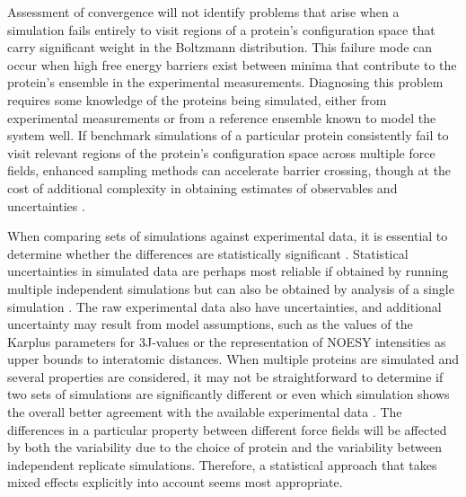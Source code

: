 \documentclass[9pt,review]{livecoms}
\begin{document}
Assessment of convergence will not identify problems that arise when a simulation fails entirely to visit regions of a protein's configuration space that carry significant weight in the Boltzmann distribution.
This failure mode can occur when high free energy barriers exist between minima that contribute to the protein's ensemble in the experimental measurements.
Diagnosing this problem requires some knowledge of the proteins being simulated, either from experimental measurements or from a reference ensemble known to model the system well.
If benchmark simulations of a particular protein consistently fail to visit relevant regions of the protein's configuration space across multiple force fields, enhanced sampling methods \cite{henin_enhanced_2022} can accelerate barrier crossing, though at the cost of additional complexity in obtaining estimates of observables and uncertainties \cite{grossfield_best_2019}.

When comparing sets of simulations against experimental data, it is essential to determine whether the differences are statistically significant \cite{van_gunsteren_validation_2018}.
Statistical uncertainties in simulated data are perhaps most reliable if obtained by running multiple independent simulations but can also be obtained by analysis of a single simulation \cite{grossfield_best_2019}.
The raw experimental data also have uncertainties, and additional uncertainty may result from model assumptions, such as the values of the Karplus parameters for 3J-values or the representation of NOESY intensities as upper bounds to interatomic distances.
When multiple proteins are simulated and several properties are considered, it may not be straightforward to determine if two sets of simulations are significantly different or even which simulation shows the overall better agreement with the available experimental data \cite{setz_molecular_2018,wassenaar_effect_2006,villa_how_2007}.
The differences in a particular property between different force fields will be affected by both the variability due to the choice of protein and the variability between independent replicate simulations.
Therefore, a statistical approach that takes mixed effects explicitly into account \cite{stroet_validation_2024} seems most appropriate.

%
\end{document}
